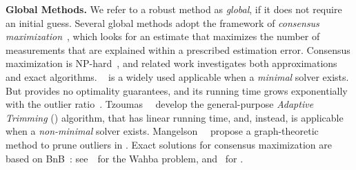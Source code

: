 {\bf Global Methods.} 
{We refer to a robust method as \textit{global}, if it does not require an initial guess. %
Several global methods adopt the framework of \emph{consensus maximization}~\cite{Chin18ECCV-robustFittingMaxCon,Chin17slcv-maximumConsensusAdvances}, which looks for an estimate  that maximizes the number of measurements that are explained within a prescribed estimation error. Consensus maximization is NP-hard~\cite{Chin18ECCV-robustFittingMaxCon,Tzoumas19iros-outliers}, and 
related work investigates both approximations and exact algorithms.
\ransac~\cite{Fischler81} is a widely used  applicable when a \textit{minimal} solver exists.
But \ransac provides no optimality guarantees, and its running time grows exponentially with the outlier ratio~\cite{Bustos18pami-GORE}. 
 Tzoumas~\etal~\cite{Tzoumas19iros-outliers} develop the general-purpose \emph{Adaptive Trimming} (\adapt) algorithm, that has linear running time, and, instead, is applicable when a \textit{non-minimal} solver exists.
Mangelson~\etal~\cite{Mangelson18icra} propose a graph-theoretic method to prune outliers in \PGO.
Exact solutions for consensus maximization are based on
BnB~\cite{Chin17slcv-maximumConsensusAdvances}:
 see~\cite{Bazin12accv-globalRotSearch}~for the Wahba problem, and~\cite{Bustos18pami-GORE} 
 for \PCR. 
} 

